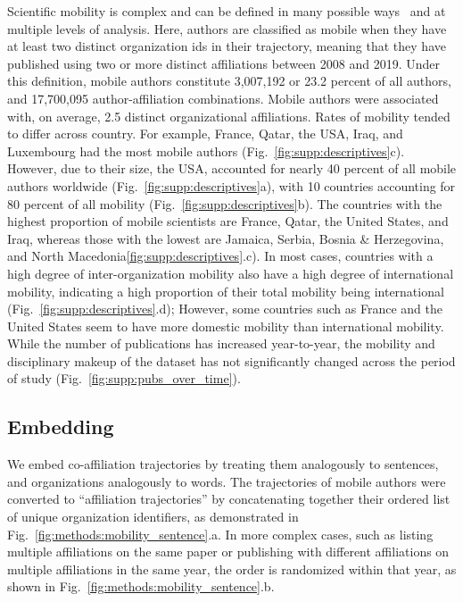 \documentclass[12pt]{article} %
\begin{document}
Scientific mobility is complex and can be defined in many possible ways~\autocite{robinson2019mobility} and at multiple levels of analysis.
Here, authors are classified as mobile when they have at least two distinct organization ids in their trajectory, meaning that they have published using two or more distinct affiliations between 2008 and 2019.
Under this definition, mobile authors constitute 3,007,192 or 23.2 percent of all authors, and 17,700,095 author-affiliation combinations.
Mobile authors were associated with, on average, 2.5 distinct organizational affiliations.
Rates of mobility tended to differ across country.
For example, France, Qatar, the USA, Iraq, and Luxembourg had the most mobile authors (Fig.~\ref{fig:supp:descriptives}c).
However, due to their size, the USA, accounted for nearly 40 percent of all mobile authors worldwide (Fig.~\ref{fig:supp:descriptives}a), with 10 countries accounting for 80 percent of all mobility (Fig.~\ref{fig:supp:descriptives}b).
The countries with the highest proportion of mobile scientists are France, Qatar, the United States, and Iraq, whereas those with the lowest are Jamaica, Serbia, Bosnia \& Herzegovina, and North Macedonia\ref{fig:supp:descriptives}.c).
In most cases, countries with a high degree of inter-organization mobility also have a high degree of international mobility, indicating a high proportion of their total mobility being international (Fig.~\ref{fig:supp:descriptives}.d);
However, some countries such as France and the United States seem to have more domestic mobility than international mobility. 
While the number of publications has increased year-to-year, the mobility and disciplinary makeup of the dataset has not significantly changed across the period of study (Fig.~\ref{fig:supp:pubs_over_time}).



\subsection*{Embedding}
We embed co-affiliation trajectories by treating them analogously to sentences, and organizations analogously to words.
The trajectories of mobile authors were converted to ``affiliation trajectories'' by concatenating together their ordered list of unique organization identifiers, as demonstrated in Fig.~\ref{fig:methods:mobility_sentence}.a.
In more complex cases, such as listing multiple affiliations on the same paper or publishing with different affiliations on multiple affiliations in the same year, the order is randomized within that year, as shown in  Fig.~\ref{fig:methods:mobility_sentence}.b.
\end{document}
